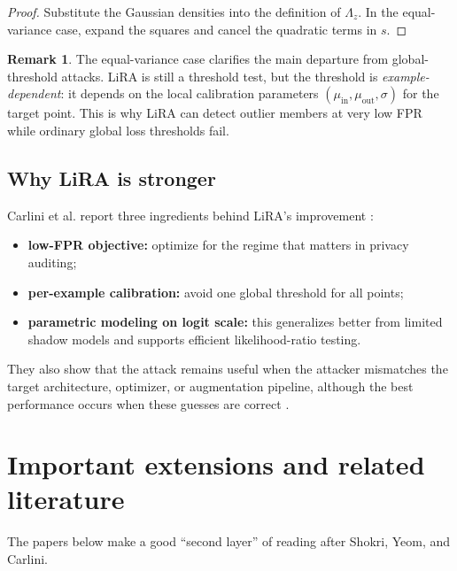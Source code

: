 \documentclass[11pt]{article}
\theoremstyle{definition}
\newtheorem{remark}[theorem]{Remark}
\newcommand{\1}{\mathbf{1}}
\begin{document}
\begin{proof}
Substitute the Gaussian densities into the definition of $\Lambda_z$. In the equal-variance case, expand the squares and cancel the quadratic terms in $s$.
\end{proof}

\begin{remark}
The equal-variance case clarifies the main departure from global-threshold attacks. LiRA is still a threshold test, but the threshold is \emph{example-dependent}: it depends on the local calibration parameters $(\mu_{\mathrm{in}},\mu_{\mathrm{out}},\sigma)$ for the target point. This is why LiRA can detect outlier members at very low FPR while ordinary global loss thresholds fail.
\end{remark}

\subsection{Why LiRA is stronger}

Carlini et al. report three ingredients behind LiRA's improvement \cite{carlini2022}:
\begin{itemize}
    \item \textbf{low-FPR objective:} optimize for the regime that matters in privacy auditing;
    \item \textbf{per-example calibration:} avoid one global threshold for all points;
    \item \textbf{parametric modeling on logit scale:} this generalizes better from limited shadow models and supports efficient likelihood-ratio testing.
\end{itemize}

They also show that the attack remains useful when the attacker mismatches the target architecture, optimizer, or augmentation pipeline, although the best performance occurs when these guesses are correct \cite{carlini2022}.

\section{Important extensions and related literature}

The papers below make a good ``second layer'' of reading after Shokri, Yeom, and Carlini.
\end{document}
